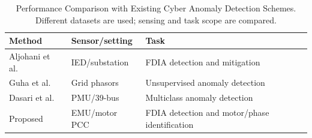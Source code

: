 \begin{table}[!t]
\centering
\caption{Performance Comparison with Existing Cyber Anomaly Detection Schemes. Different datasets are used; sensing and task scope are compared.}
\label{tab:prior_work}
\small
\setlength{\tabcolsep}{3pt}
\begin{tabular}{@{}p{.27\linewidth}p{.24\linewidth}p{.42\linewidth}@{}}
\toprule
Method & Sensor/setting & Task \\
\midrule
Aljohani et al.~\cite{aljohani2024} & IED/substation & FDIA detection and mitigation \\
Guha et al.~\cite{guha} & Grid phasors & Unsupervised anomaly detection \\
Dasari et al.~\cite{pmu_lstm_2025} & PMU/39-bus & Multiclass anomaly detection \\
Proposed & EMU/motor PCC & FDIA detection and motor/phase identification \\
\bottomrule
\end{tabular}
\end{table}

